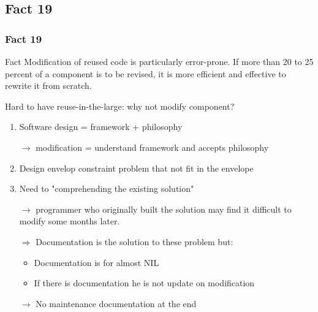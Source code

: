 \documentclass{beamer}
\begin{document}
\subsection{Fact 19}
\begin{frame}
    \frametitle{Fact 19}
    \begin{block}{Fact}
    Modification of reused code is particularly error-prone. If more than 20 to
    25 percent of a component is to be revised, it is more efficient and
    effective to rewrite it from scratch.
    \end{block}

    Hard to have reuse-in-the-large: why not modify component?

    \begin{enumerate}
        \item Software design = framework + philosophy 

            $\rightarrow$ modification = understand
            framework and accepts philosophy

        \item Design envelop constraint problem that not fit in the
            envelope

        \item Need to "comprehending the existing solution"

            $\rightarrow$ programmer who originally built the solution
            may find it difficult to modify some months later.

        \item[$\Rightarrow$] Documentation is the solution to these
            problem but:
            \begin{itemize}
                    \item Documentation is for almost NIL
                    \item If there is documentation he is not update on
                        modification
            \end{itemize}

            $\rightarrow$ No maintenance documentation at the end
    \end{enumerate}

\end{frame}
\end{document}
